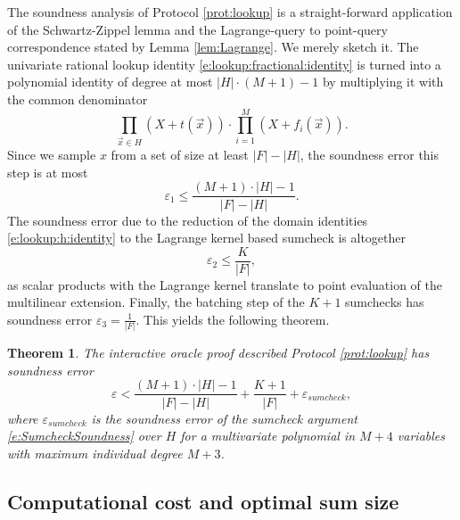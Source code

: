 \documentclass[11pt]{article}
\newtheorem{thm}{Theorem}[]
\theoremstyle{definition}
\theoremstyle{definition}
\newtheorem{rem}[thm]{Remark}
\begin{document}
The soundness analysis of Protocol \ref{prot:lookup} is a straight-forward application of the Schwartz-Zippel lemma and the Lagrange-query to point-query correspondence stated by Lemma \ref{lem:Lagrange}.
We merely sketch it.
The univariate rational lookup identity \eqref{e:lookup:fractional:identity} is turned into a polynomial identity of degree at most $|H|\cdot (M+1) - 1$ by multiplying it with the common denominator  
\begin{equation}
\label{e:lookup:common:denominator}
\prod_{\vec x\in H} (X + t(\vec x)) \cdot \prod_{i=1}^M (X + f_i(\vec x)).
\end{equation}
Since we sample $x$ from a set of size at least $|F|-|H|$, the soundness error this step is at most 
\begin{equation}
\label{e:lookup:epsilon1}
\varepsilon_1 \leq \frac{(M+1)\cdot |H| - 1 }{|F|-|H|}.
\end{equation}
The soundness error due to the reduction of the domain identities  \eqref{e:lookup:h:identity}  to the Lagrange kernel based sumcheck is altogether
\[
\varepsilon_2 \leq \frac{K}{|F|},
\]
as scalar products with the Lagrange kernel translate to point evaluation of the multilinear extension.
Finally, the batching step of the $K+1$ sumchecks has soundness error $\varepsilon_3 = \frac{1}{|F|}$.
This yields the following theorem. 

\begin{thm}
\label{thm:lookup:soundness}
 The interactive oracle proof described Protocol \ref{prot:lookup} has soundness error
\[
\varepsilon < \frac{(M+1)\cdot |H| - 1 }{|F|-|H|} + \frac{K+1}{|F|} + \varepsilon_{sumcheck},
\]
where $\varepsilon_{sumcheck}$ is the soundness error of the sumcheck argument \eqref{e:SumcheckSoundness} over $H$ for a multivariate polynomial in $M+4$ variables with maximum individual degree $M+3$.
\end{thm}


\subsection{Computational cost and optimal sum size}
\label{s:lookup:cost}
\end{document}
